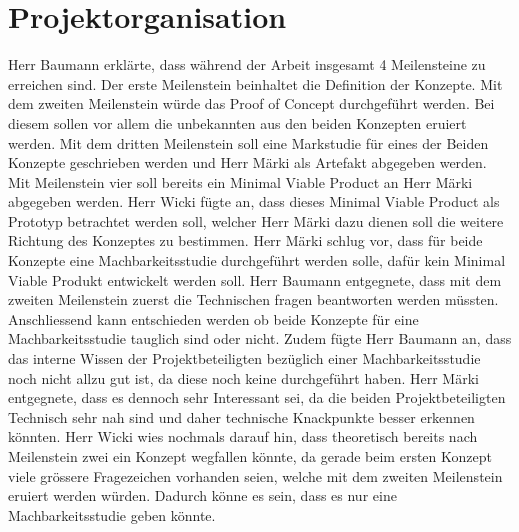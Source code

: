\documentclass[parskip=full, a4paper]{scrreprt}
\begin{document}
\chapter{Projektorganisation}
Herr Baumann erklärte, dass während der Arbeit insgesamt 4 Meilensteine zu erreichen sind. Der erste Meilenstein beinhaltet die Definition der Konzepte. Mit dem zweiten Meilenstein würde das Proof of Concept durchgeführt werden. Bei diesem sollen vor allem die unbekannten aus den beiden Konzepten eruiert werden. Mit dem dritten Meilenstein soll eine Markstudie für eines der Beiden Konzepte geschrieben werden und Herr Märki als Artefakt abgegeben werden. Mit Meilenstein vier soll bereits ein Minimal Viable Product an Herr Märki abgegeben werden.
Herr Wicki fügte an, dass dieses Minimal Viable Product als Prototyp betrachtet werden soll, welcher Herr Märki dazu dienen soll die weitere Richtung des Konzeptes zu bestimmen.
Herr Märki schlug vor, dass für beide Konzepte eine Machbarkeitsstudie durchgeführt werden solle, dafür kein Minimal Viable Produkt entwickelt werden soll. Herr Baumann entgegnete, dass mit dem zweiten Meilenstein zuerst die Technischen fragen beantworten werden müssten. Anschliessend kann entschieden werden ob beide Konzepte für eine Machbarkeitsstudie tauglich sind oder nicht. Zudem fügte Herr Baumann an, dass das interne Wissen der Projektbeteiligten bezüglich einer Machbarkeitsstudie noch nicht allzu gut ist, da diese noch keine durchgeführt haben. 
Herr Märki entgegnete, dass es dennoch sehr Interessant sei, da die beiden Projektbeteiligten Technisch sehr nah sind und daher technische Knackpunkte besser erkennen könnten.
Herr Wicki wies nochmals darauf hin, dass theoretisch bereits nach Meilenstein zwei ein Konzept wegfallen könnte, da gerade beim ersten Konzept viele grössere Fragezeichen vorhanden seien, welche mit dem zweiten Meilenstein eruiert werden würden. Dadurch könne es sein, dass es nur eine Machbarkeitsstudie geben könnte.
\end{document}
